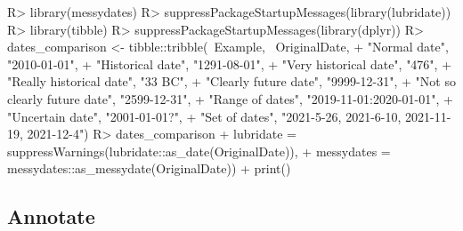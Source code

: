 \documentclass[
]{jss}
\begin{document}
\begin{CodeChunk}
\begin{CodeInput}
R> library(messydates)
R> suppressPackageStartupMessages(library(lubridate))
R> library(tibble)
R> suppressPackageStartupMessages(library(dplyr))
R> dates_comparison <- tibble::tribble(~Example, ~OriginalDate,
+                                     "Normal date", "2010-01-01",
+                                     "Historical date", "1291-08-01",
+                                     "Very historical date", "476",
+                                     "Really historical date", "33 BC",
+                                     "Clearly future date", "9999-12-31",
+                                     "Not so clearly future date", "2599-12-31",
+                                     "Range of dates", "2019-11-01:2020-01-01",
+                                     "Uncertain date", "2001-01-01?",
+                                     "Set of dates", "2021-5-26, 2021-6-10, 2021-11-19, 2021-12-4")
R> dates_comparison %
+                                    lubridate = suppressWarnings(lubridate::as_date(OriginalDate)),
+                                    messydates = messydates::as_messydate(OriginalDate)) %
+   print()
\end{CodeInput}
\begin{CodeOutput}
# A tibble: 9 x 5
  Example                    OriginalDate       base       lubridate  messydates
  <chr>                      <chr>              <date>     <date>     <messydt> 
1 Normal date                2010-01-01         2010-01-01 2010-01-01 2010-01-0~
2 Historical date            1291-08-01         1291-08-01 1291-08-01 1291-08-0~
3 Very historical date       476                NA         NA         0476     ~
4 Really historical date     33 BC              NA         NA         -0033    ~
5 Clearly future date        9999-12-31         9999-12-31 9999-12-31 9999-12-3~
6 Not so clearly future date 2599-12-31         2599-12-31 2599-12-31 2599-12-3~
7 Range of dates             2019-11-01:2020-0~ 2019-11-01 2019-11-01 2019-11-0~
8 Uncertain date             2001-01-01?        2001-01-01 2001-01-01 2001-01-0~
9 Set of dates               2021-5-26, 2021-6~ 2021-05-26 NA         {2021-05-~
\end{CodeOutput}
\end{CodeChunk}

\hypertarget{annotate}{%
\subsection{Annotate}\label{annotate}}
\end{document}
